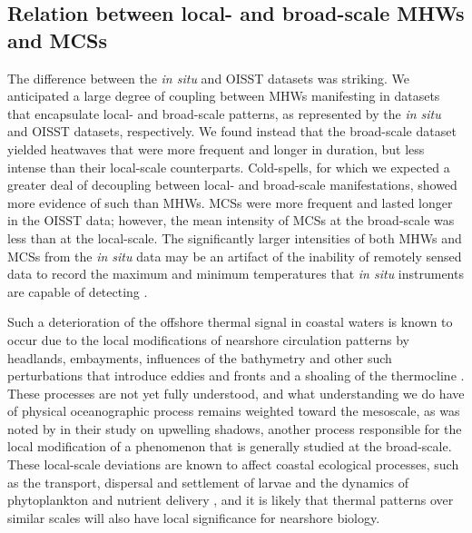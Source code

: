 \documentclass[a4paper,10pt,review]{elsarticle}
\begin{document}
\subsection{Relation between local- and broad-scale MHWs and MCSs}
The difference between the \emph{in situ} and OISST datasets was striking. We anticipated a large degree of coupling between MHWs manifesting in datasets that encapsulate local- and broad-scale patterns, as represented by the \emph{in situ} and OISST datasets, respectively. We found instead that the broad-scale dataset yielded heatwaves that were more frequent and longer in duration, but less intense than their local-scale counterparts. Cold-spells, for which we expected a greater deal of decoupling between local- and broad-scale manifestations, showed more evidence of such than MHWs. MCSs were more frequent and lasted longer in the OISST data; however, the mean intensity of MCSs at the broad-scale was less than at the local-scale. The significantly larger intensities of both MHWs and MCSs from the \emph{in situ} data may be an artifact of the inability of remotely sensed data to record the maximum and minimum temperatures that \emph{in situ} instruments are capable of detecting \citep{Smale2009}.

Such a deterioration of the offshore thermal signal in coastal waters is known to occur due to the local modifications of nearshore circulation patterns by headlands, embayments, influences of the bathymetry and other such perturbations that introduce eddies and fronts and a shoaling of the thermocline \citep{Okubo1973, Pingree1979, Wolanski1988, Black1990, Grundlingh1991, Graham1997}. These processes are not yet fully understood, and what understanding we do have of physical oceanographic process remains weighted toward the mesoscale, as was noted by \citet{Graham1997} in their study on upwelling shadows, another process responsible for the local modification of a phenomenon that is generally studied at the broad-scale. These local-scale deviations are known to affect coastal ecological processes, such as the transport, dispersal and settlement of larvae \citep{Pineda1994, McCulloch2003, Narvaez2004} and the dynamics of phytoplankton and nutrient delivery \citep{Graham1997, Pineda1994}, and it is likely that thermal patterns over similar scales will also have local significance for nearshore biology.
\end{document}
